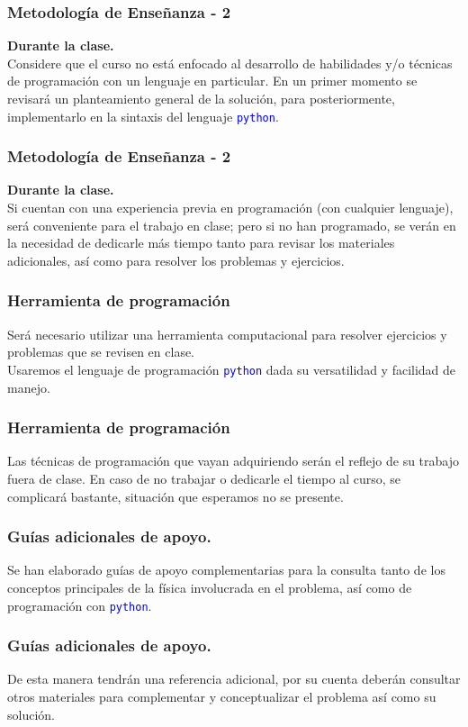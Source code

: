 \documentclass[12pt]{beamer}
\begin{document}
\begin{frame} 
\frametitle{Metodología de Enseñanza - 2}
\textbf{Durante la clase.}
\\
\medskip
Considere que el curso no está enfocado al desarrollo de habilidades y/o técnicas de programación con un lenguaje en particular. En un primer momento se revisará un planteamiento general de la solución, para posteriormente, implementarlo en la sintaxis del lenguaje \textcolor{blue}{\texttt{python}}.
\end{frame}
\begin{frame} 
\frametitle{Metodología de Enseñanza - 2}
\textbf{Durante la clase.}
\\
\vspace{0.5em}
Si cuentan con una experiencia previa en programación (con cualquier lenguaje), será conveniente para el trabajo en clase; pero si no han programado, se verán en la necesidad de dedicarle más tiempo tanto para revisar los materiales adicionales, así como para resolver los problemas y ejercicios.
\end{frame}
\begin{frame}
\frametitle{Herramienta de programación}
Será necesario utilizar una herramienta computacional para resolver ejercicios y problemas que se revisen en clase.
\\
\bigskip
Usaremos el lenguaje de programación \textcolor{blue}{\texttt{python}} dada su versatilidad y facilidad de manejo.
\end{frame}
\begin{frame}
\frametitle{Herramienta de programación}
Las técnicas de programación que vayan adquiriendo serán el reflejo de su trabajo fuera de clase. En caso de no trabajar o dedicarle el tiempo al curso, se complicará bastante, situación que esperamos no se presente.
\end{frame}
\begin{frame}
\frametitle{Guías adicionales de apoyo.}
Se han elaborado guías de apoyo complementarias para la consulta tanto de los conceptos principales de la física involucrada en el problema, así como de programación con \textcolor{blue}{\texttt{python}}.
\end{frame}
\begin{frame}
\frametitle{Guías adicionales de apoyo.}
De esta manera tendrán una referencia adicional, por su cuenta deberán consultar otros materiales para complementar y conceptualizar el problema así como su solución.
\end{frame}
\end{document}
